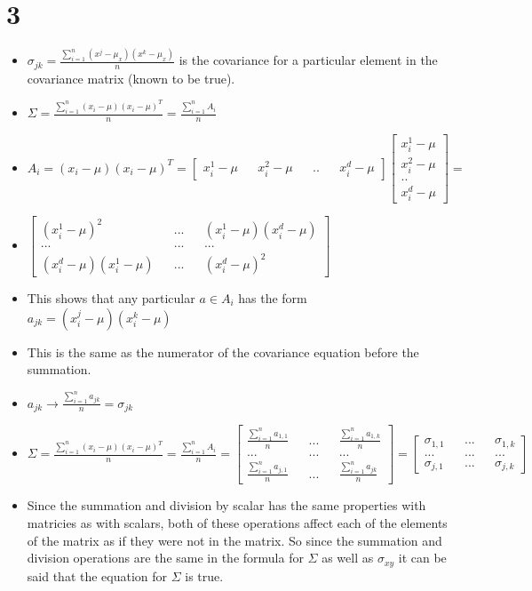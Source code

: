 \documentclass[11pt]{article}
\begin{document}
\section*{3}
\label{sec:org41fbc1f}
\begin{itemize}
\item \(\sigma_{jk} = \frac{\sum^n_{i=1}(x^j-\mu_x)(x^k-\mu_x)}{n}\) is the covariance for a particular
element in the covariance matrix (known to be true).
\item \(\Sigma = \frac{\sum^n_{i=1}(x_i-\mu)(x_i-\mu)^T}{n} = \frac{\sum^n_{i=1}A_i}{n}\)
\item \(A_i = (x_i-\mu)(x_i-\mu)^T = \begin{bmatrix} x^1_i -\mu&& x^2_i-\mu && ..&& x^d_i -\mu\end{bmatrix}
  \begin{bmatrix} x^1_i-\mu\\ x^2_i -\mu\\ ..\\ x^d_i -\mu\end{bmatrix} =\)
\item \(\begin{bmatrix} (x^1_i-\mu)^2 && ... && (x^1_i-\mu)(x^d_i-\mu) \\... && ... && ... \\ (x^d_i-\mu)(x^1_i-\mu) && ... && (x^d_i-\mu)^2\end{bmatrix}\)
\item This shows that any particular \(a \in A_i\) has the form \(a_{jk} =
  (x^{j}_i-\mu)(x^{k}_i-\mu)\)

\item This is the same as the numerator of the covariance equation before the summation.

\item \(a_{jk} \rightarrow \frac{\sum^n_{i=1}a_{jk}}{n} = \sigma_{jk}\)

\item \(\Sigma = \frac{\sum^n_{i=1}(x_i-\mu)(x_i-\mu)^T}{n} = \frac{\sum^n_{i=1}A_i}{n}
  = \begin{bmatrix} \frac{\sum^n_{i=1}a_{1,1}}{n} && ... &&
  \frac{\sum^n_{i=1}a_{1,k}}{n}  \\... && ... && ... \\ \frac{\sum^n_{i=1}a_{j,1}}{n}
  && ... && \frac{\sum^n_{i=1}a_{jk}}{n}\end{bmatrix} = \begin{bmatrix} \sigma_{1, 1} &&
  ... && \sigma_{1, k} \\ ... && ... && ... \\ \sigma_{j, 1} && ... && \sigma_{j, k}\end{bmatrix}\)

\item Since the summation and division by scalar has the same properties with
matricies as with scalars, both of these operations affect each of the
elements of the matrix as if they were not in the matrix. So since the
summation and division operations are the same in the formula for \(\Sigma\) as
well as \(\sigma_{xy}\) it can be said that the equation for \(\Sigma\) is true.
\end{itemize}
\end{document}
